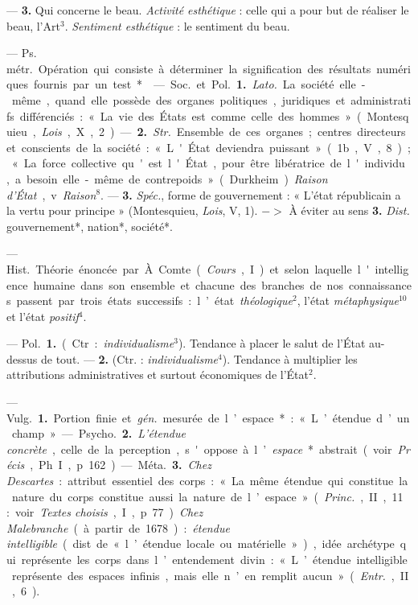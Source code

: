 \begin{itemize}[leftmargin=1cm, label=, itemsep=1pt]
 — {\bf 3.} Qui concerne
le beau. {\it Activité esthétique} : celle qui
a pour but de réaliser le beau, l’Art$^3$.
{\it Sentiment esthétique} : le sentiment du beau.

 — \si{Ps. métr.} Opération
qui consiste à déterminer la signification des résultats numériques
fournis par un test*.

 — \si{Soc.} et \si{Pol.} {\bf 1.} {\it Lato.} La société
elle-même, quand elle possède des
organes politiques, juridiques et
administratifs différenciés : « La vie
des États est comme celle des hommes » (Montesquieu, {\it Lois}, X, 2). —
 {\bf 2.} {\it Str.} Ensemble de ces organes;
centres directeurs et conscients de
la société : « L'État deviendra puissant »
(1b., V, 8); « La force collective qu'est l'État, pour être libératrice
de l'individu, a besoin elle-même de contrepoids » (Durkheim).
{\it Raison d'État}, v. {\it Raison}$^8$. — {\bf 3.}
{\it Spéc.}, forme de gouvernement :
« L'état républicain a la vertu pour
principe » (Montesquieu, {\it Lois}, V, 1).
$->$ À éviter au sens {\bf 3.} {\it Dist.} gouvernement*, nation*, société*.

 — \si{Hist.} Théorie
énoncée par À. Comte ({\it Cours}, I) et
selon laquelle l'intelligence humaine
dans son ensemble et chacune des
branches de nos connaissances passent par trois états successifs : l’état
{\it théologique}$^2$, l'état {\it métaphysique}$^{10}$
et l'état {\it positif}$^4$.

 — \si{Pol.} {\bf 1.} (Ctr. : {\it individualisme}$^3$).
Tendance à placer le salut de l'État au-dessus de tout. — {\bf 2.}
(Ctr. : {\it individualisme}$^4$). Tendance à multiplier les attributions
administratives et surtout économiques de l'État$^2$.

 — \si{Vulg.} {\bf 1.} Portion finie et
{\it gén.} mesurée de l’espace* : « L’étendue d’un champ ».

— \si{Psycho.} {\bf 2.} {\it L'étendue concrète},
celle de la perception, s'oppose à
l’{\it espace}* abstrait (voir  {\it Précis}, Ph. I,
p. 162).

— \si{Méta.} {\bf 3.} {\it Chez Descartes} :
attribut essentiel des corps : « La
même étendue qui constitue la nature du corps constitue aussi la
nature de l’espace » ({\it Princ.}, II, 11 :
voir {\it Textes choisis}, I, p. 77). {\it Chez
Malebranche} (à partir de 1678) :
{\it étendue intelligible} (dist. de « l’étendue locale ou matérielle »),
idée archétype qui représente les corps
dans l’entendement divin : « L’étendue intelligible représente des espaces
infinis, mais elle n’en remplit aucun » ({\it Entr.}, II, 6).


\end{itemize}

